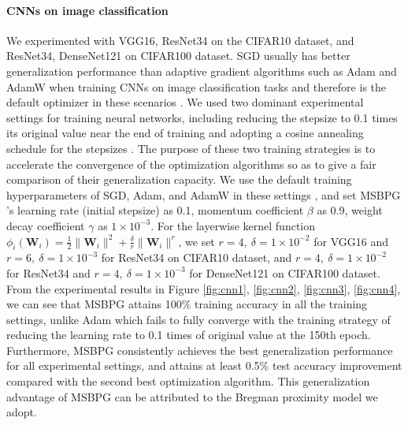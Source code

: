 \documentclass[twoside,11pt]{article}
\def\mW{{\bm{W}}}
\begin{document}
{\paragraph{CNNs on image classification} We experimented with VGG16, ResNet34 on the CIFAR10 dataset, and ResNet34, DenseNet121 on CIFAR100 dataset. SGD usually has better generalization performance than adaptive gradient algorithms such as Adam and AdamW when training CNNs on image classification tasks and therefore is the default optimizer in these scenarios \citep{he2016deep,zhou2020towards}. We used two dominant experimental settings for training neural networks, including reducing the stepsize to 0.1 times its original value near the end of training \citep{zhuang2020adabelief,chen2021closing,luo2019adaptive} and adopting a cosine annealing schedule for the stepsizes \citep{loshchilov2016sgdr,loshchilov2017decoupled}. The purpose of these two training strategies is to accelerate the convergence of the optimization algorithms so as to give a fair comparison of their generalization capacity. We use the default training hyperparameters of SGD, Adam, and AdamW in these settings \citep{he2016deep,zhuang2020adabelief,chen2021closing}, and set MSBPG 's learning rate (initial stepsize) as 0.1, momentum coefficient $\beta$ as 0.9, weight decay coefficient $\gamma$ as $1\times 10^{-3}$. For the layerwise kernel function $\phi_i({\mW}_i)=\frac{1}{2}\|{\mW}_i\|^2+\frac{\delta}{r}\|{\mW}_i\|^{r}$, we set $r=4,\ \delta=1\times 10^{-2}$ for VGG16 and $r=6,\ \delta=1 \times 10^{-3}$ for ResNet34 on CIFAR10 dataset, and $r=4,\ \delta=1\times 10^{-2}$ for ResNet34 and $r=4,\ \delta=1 \times 10^{-3}$ for DenseNet121 on CIFAR100 dataset. From the experimental results in Figure \ref{fig:cnn1}, \ref{fig:cnn2}, \ref{fig:cnn3}, \ref{fig:cnn4}, we can see that MSBPG  attains 100\% training accuracy in all the training settings, unlike Adam which fails to fully converge with the training strategy of reducing the learning rate to 0.1 times of original value at the 150th epoch. Furthermore, MSBPG  consistently achieves the best generalization performance for all experimental settings, and attains at least 0.5\% test accuracy improvement compared with the second best optimization algorithm. This generalization advantage of MSBPG  
can be attributed to the Bregman proximity model we adopt.

}
\end{document}
